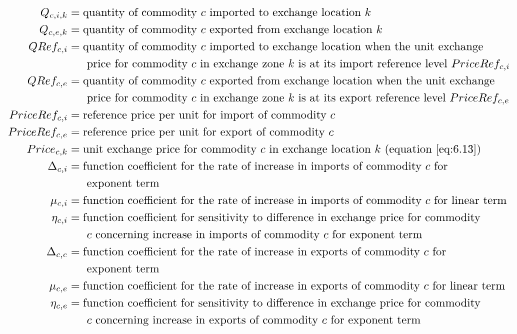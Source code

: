 \begin{align*}
Q_{c,i,k} &= \text{quantity of commodity $c$ imported to exchange location $k$} \\ 
Q_{c,e,k} &= \text{quantity of commodity $c$ exported from exchange location $k$} \\ 
QRef_{c,i} &= \text{quantity of commodity $c$ imported to exchange location when the unit exchange} \\
 &~~~~~\text{price for commodity $c$ in exchange zone $k$ is at its import reference level} ~PriceRef_{c,i} \\ 
QRef_{c,e} &= \text{quantity of commodity $c$ exported from exchange location when the unit exchange} \\
 &~~~~~\text{price for commodity $c$ in exchange zone $k$ is at its export reference level} ~PriceRef_{c,e} \\
PriceRef_{c,i} &= \text{reference price per unit for import of commodity $c$} \\ 
PriceRef_{c,e} &= \text{reference price per unit for export of commodity $c$} \\ 
Price_{c,k} &= \text{unit exchange price for commodity $c$ in exchange location $k$ (equation \ref{eq:6.13})} \\ 
\Delta_{c,i} &= \text{function coefficient for the rate of increase in imports of commodity $c$ for} \\
 &~~~~~\text{exponent term} \\ 
\mu_{c,i} &= \text{function coefficient for the rate of increase in imports of commodity $c$ for linear term} \\ 
\eta_{c,i} &= \text{function coefficient for sensitivity to difference in exchange price for commodity} \\
 &~~~~~\text{$c$ concerning increase in imports of commodity $c$ for exponent term} \\ 
\Delta_{c,e} &= \text{function coefficient for the rate of increase in exports of commodity $c$ for} \\
 &~~~~~\text{exponent term} \\ 
\mu_{c,e} &= \text{function coefficient for the rate of increase in exports of commodity $c$ for linear term} \\ 
\eta_{c,e} &= \text{function coefficient for sensitivity to difference in exchange price for commodity} \\
 &~~~~~\text{$c$ concerning increase in exports of commodity $c$ for exponent term} 
\end{align*}






